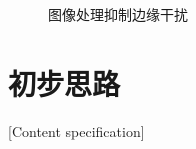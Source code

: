 \documentclass[fontset=fandol,type=bachelor,campus=harbin,bsmainpagenumberline=true]{hithesisbook}
\begin{document}
\begin{figure}[h]
{		\label{图像处理抑制边缘干扰c}
	}
	\caption{图像处理抑制边缘干扰}
	\label{图像处理抑制边缘干扰}
\end{figure}



\section{初步思路}[Content specification]
\end{document}
